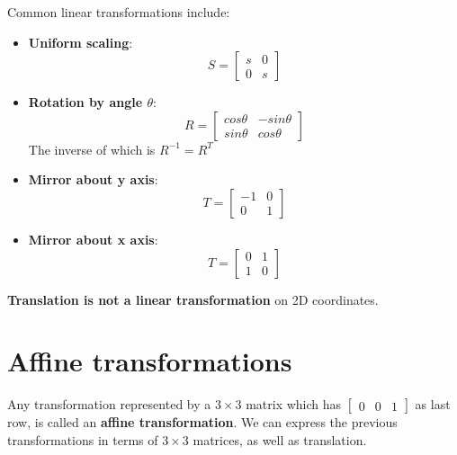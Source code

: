 \documentclass{article}
\begin{document}
Common linear transformations include:
\begin{itemize}
    \item \textbf{Uniform scaling}:
    \begin{equation*}
        S = \begin{bmatrix}
            s & 0 \\ 
            0 & s
        \end{bmatrix}
    \end{equation*}
    \item \textbf{Rotation by angle $\theta$}:
    \begin{equation*}
        R = \begin{bmatrix}
            cos\theta & -sin\theta \\ 
            sin\theta & cos\theta
        \end{bmatrix}
    \end{equation*}
    The inverse of which is $R^{-1} = R^T$
    \item \textbf{Mirror about y axis}:
    \begin{equation*}
        T = \begin{bmatrix}
            -1 & 0 \\
            0 & 1
        \end{bmatrix}
    \end{equation*}
    \item \textbf{Mirror about x axis}:
    \begin{equation*}
        T = \begin{bmatrix}
            0 & 1 \\
            1 & 0
        \end{bmatrix}
    \end{equation*}
\end{itemize}

\textbf{Translation is not a linear transformation} on 2D coordinates.

\section*{Affine transformations}

Any transformation represented by a $3\times 3$ matrix which has $\begin{bmatrix}
    0 & 0 & 1
\end{bmatrix}$
as last row, is called an \textbf{affine transformation}. We can express the previous transformations in terms of $3\times 3$ matrices, as well as translation.\\ 
\end{document}
